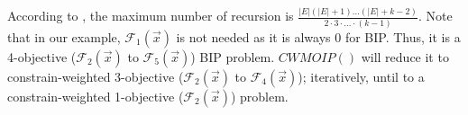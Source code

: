 According to \cite{DBLP:journals/eor/OzlenA09}, the maximum number of recursion is $\frac{|E|(|E|+1)...(|E|+k-2)}{2\cdot 3 \cdot ... \cdot(k-1)}$.
Note that in our example, $\mathcal{F}_1(\vec x)$ is not needed as it is always   $0$ for BIP. Thus, it is a 4-objective ($\mathcal{F}_2(\vec x)$ to $\mathcal{F}_5(\vec x)$) BIP problem. $CWMOIP()$ will reduce it to constrain-weighted 3-objective ($\mathcal{F}_2(\vec x)$ to $\mathcal{F}_4(\vec x)$); iteratively, until to a constrain-weighted 1-objective ($\mathcal{F}_2(\vec x)$) problem.
%
%
